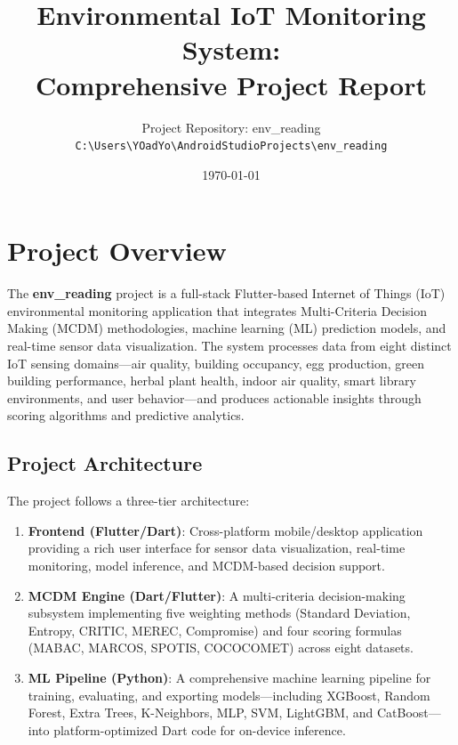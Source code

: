 \documentclass[12pt,a4paper,oneside]{report}
\title{\textbf{Environmental IoT Monitoring System:\\ Comprehensive Project Report}}
\author{
  Project Repository: env\_reading\\
  \texttt{C:\textbackslash Users\textbackslash YOadYo\textbackslash AndroidStudioProjects\textbackslash env\_reading}
}
\date{\today}
\begin{document}
\maketitle
\tableofcontents
\newpage

\chapter{Project Overview}
\label{ch:overview}

The \textbf{env\_reading} project is a full-stack Flutter-based Internet of Things (IoT) environmental monitoring application that integrates Multi-Criteria Decision Making (MCDM) methodologies, machine learning (ML) prediction models, and real-time sensor data visualization. The system processes data from eight distinct IoT sensing domains---air quality, building occupancy, egg production, green building performance, herbal plant health, indoor air quality, smart library environments, and user behavior---and produces actionable insights through scoring algorithms and predictive analytics.

\section{Project Architecture}

The project follows a three-tier architecture:

\begin{enumerate}
  \item \textbf{Frontend (Flutter/Dart)}: Cross-platform mobile/desktop application providing a rich user interface for sensor data visualization, real-time monitoring, model inference, and MCDM-based decision support.
  \item \textbf{MCDM Engine (Dart/Flutter)}: A multi-criteria decision-making subsystem implementing five weighting methods (Standard Deviation, Entropy, CRITIC, MEREC, Compromise) and four scoring formulas (MABAC, MARCOS, SPOTIS, COCOCOMET) across eight datasets.
  \item \textbf{ML Pipeline (Python)}: A comprehensive machine learning pipeline for training, evaluating, and exporting models---including XGBoost, Random Forest, Extra Trees, K-Neighbors, MLP, SVM, LightGBM, and CatBoost---into platform-optimized Dart code for on-device inference.
\end{enumerate}
\end{document}
